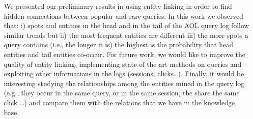 We presented our preliminary results in using entity linking in order
to find hidden connections between popular and rare queries. 
In this work we observed that: i) spots and entities 
in the head and in the tail of the AOL query log follow similar trends but ii) 
the most frequent entities are different iii) the more spots a query contains 
(i.e., the longer it is) the highest is the probability that head entities and
tail entities co-occur. For future work, we would like to improve the quality 
of entity linking, implementing state of the art methods on queries and
exploiting other informations in the logs (sessions, clicks\dots). Finally, it would 
be interesting studying the relationships among the entities mined in the query log
(e.g., they occur in the same query, or in the same session, the share the same click \dots) and
compare them with the relations that we have in the knowledge base.
